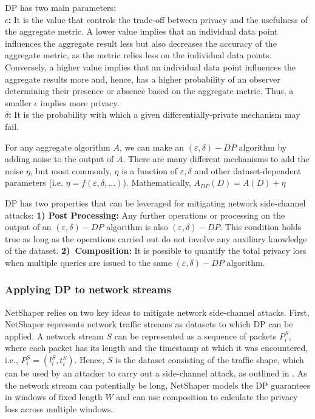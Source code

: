 DP has two main parameters: \\
\textbf{$\epsilon$: } It is the value that controls the trade-off between privacy and the usefulness of the aggregate metric.
A lower value implies that an individual data point influences the aggregate result less but also decreases the accuracy of the aggregate metric, as the metric relies less on the individual data points.
Conversely, a higher value implies that an individual data point influences the aggregate results more and, hence, has a higher probability of an observer determining their presence or absence based on the aggregate metric.
Thus, a smaller $\epsilon$ implies more privacy.\\
\textbf{$\delta$: } It is the probability with which a given differentially-private mechanism may fail.


For any aggregate algorithm $A$, we can make an $(\varepsilon, \delta)-DP$ algorithm by adding noise to the output of $A$.
There are many different mechanisms to add the noise $\eta$, but most commonly, $\eta$ is a function of $\varepsilon, \delta$ and other dataset-dependent parameters (i.e. $\eta = f(\varepsilon, \delta, ...)$).
Mathematically, $A_{DP}(D) = A(D) + \eta$

DP has two properties that can be leveraged for mitigating network side-channel attacks: 
\textbf{1) Post Processing:} Any further operations or processing on the output of an $(\varepsilon, \delta)-DP$ algorithm is also $(\varepsilon, \delta)-DP$.
This condition holds true as long as the operations carried out do not involve any auxiliary knowledge of the dataset.
\textbf{2)~Composition:} It is possible to quantify the total privacy loss when multiple queries are issued to the same $(\varepsilon, \delta)-DP$ algorithm.

\subsubsection{Applying DP to network streams}
\label{subsubsec:netshaper-background-framework-applying-dp}
NetShaper relies on two key ideas to mitigate network side-channel attacks.
First, NetShaper represents network traffic streams as datasets to which DP can be applied.
A network stream $S$ can be represented as a sequence of packets $P_i^S$, where each packet has its length and the timestamp at which it was encountered, i.e., $P_i^S = (l_i^S, t_i^S)$.
Hence, $S$ is the dataset consisting of the traffic shape, which can be used by an attacker to carry out a side-channel attack, as outlined in .
As the network stream can potentially be long, NetShaper models the DP guarantees in windows of fixed length $W$ and can use composition to calculate the privacy loss across multiple windows.

